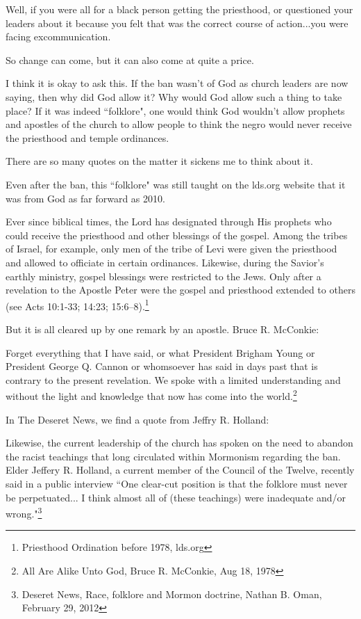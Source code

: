 \documentclass{article}
\begin{document}
Well, if you were all for a black person getting the priesthood, or questioned 
your leaders about it because you felt that was the correct course of 
action...you were facing excommunication.

So change can come, but it can also come at quite a price.

I think it is okay to ask this. If the ban wasn't of God as church leaders are 
now saying, then why did God allow it? Why would God allow such a thing to take 
place? If it was indeed ``folklore", one would think God wouldn't allow prophets 
and apostles of the church to allow people to think the negro would never 
receive the priesthood and temple ordinances.

There are so many quotes on the matter it sickens me to think about it.

Even after the ban, this ``folklore" was still taught on the lds.org 
website that it was from God as far forward as 2010.

\begin{displayquote}
Ever  since  biblical  times,  the  Lord  has  designated  through  His  
prophets  who  could  receive  the priesthood  and  other  blessings  of  the  
gospel.  Among  the  tribes  of  Israel,  for  example,  only  men  of  
the tribe  of  Levi  were  given  the  priesthood  and  allowed  to  
officiate  in  certain  ordinances.  Likewise,  during  the Savior's  
earthly  ministry,  gospel  blessings  were  restricted  to  the  Jews.  
Only  after  a  revelation  to  the Apostle  Peter  were  the  gospel  and  
priesthood  extended  to  others  
(see  Acts  10:1-33;  
14:23;  15:6–8).\footnote{Priesthood  Ordination  before  1978, lds.org}
\end{displayquote}

But it is all cleared up by one remark by an apostle. Bruce R. McConkie:

\begin{displayquote}
Forget everything that I have said, or what President Brigham Young or 
President George Q. Cannon or whomsoever has said in days past that is contrary 
to the present revelation. We spoke with a limited understanding and without the 
light and knowledge that now has come into the world.\footnote{All Are Alike 
Unto God, Bruce R. McConkie, Aug 18, 1978}
\end{displayquote}

In The Deseret News, we find a quote from Jeffry R. Holland:

\begin{displayquote}
Likewise, the current leadership of the church has spoken on the need to 
abandon the racist teachings that long circulated within Mormonism 
regarding the ban. Elder Jeffery R. Holland, a current member of the 
Council of the Twelve, recently said in a public interview 
``One clear-cut position is that the folklore must never be perpetuated...
I think almost all of (these teachings) were inadequate and/or 
wrong."\footnote{Deseret News, Race, folklore and Mormon doctrine, 
Nathan B. Oman, February 29, 2012}
\end{displayquote}
\end{document}
